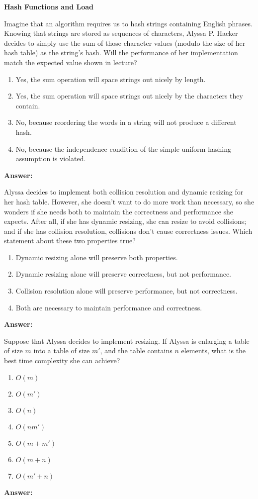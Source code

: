 \documentclass[12pt,twoside]{article}
\newcommand{\answer}{
 \par\medskip
 \textbf{Answer:}
}
\newcommand{\answerIa}{ \answer

}
\newcommand{\answerIb}{ \answer

}
\newcommand{\answerIc}{ \answer

}
\begin{document}
\begin{problems}

\problem {} \textbf{Hash Functions and Load}

\begin{problemparts}

\problempart Imagine that an algorithm requires us to hash strings containing English
phrases. Knowing that strings are stored as sequences of characters, Alyssa P. Hacker
decides to simply use the sum of those character values (modulo the size of her hash
table) as the string’s hash. Will the performance of her implementation match the
expected value shown in lecture?
  \begin{enumerate}
    \item Yes, the sum operation will space strings out nicely by length.
    \item Yes, the sum operation will space strings out nicely by the characters 
      they contain.
    \item No, because reordering the words in a string will not produce a different
      hash.
    \item No, because the independence condition of the simple uniform hashing
      assumption is violated.
  \end{enumerate}
\answerIa

  \problempart Alyssa decides to implement both collision resolution and dynamic
  resizing for her hash table. However, she doesn’t want to do more work than
  necessary, so she wonders if she needs both to maintain the correctness and
  performance she expects. After all, if she has dynamic resizing, she can resize to
  avoid collisions; and if she has collision resolution, collisions don’t cause
  correctness issues. Which statement about these two properties true?
    \begin{enumerate}
      \item Dynamic resizing alone will preserve both properties.
      \item Dynamic resizing alone will preserve correctness, but not performance.
      \item Collision resolution alone will preserve performance, but not
        correctness.
      \item Both are necessary to maintain performance and correctness.
    \end{enumerate}
\answerIb
    
  \problempart Suppose that Alyssa decides to implement resizing. If Alyssa is
  enlarging a table of size $m$ into a table of size $m'$, and the table contains
  $n$ elements, what is the best time complexity she can achieve?
    \begin{enumerate}
      \item $O(m)$
      \item $O(m')$
      \item $O(n)$
      \item $O(nm')$
      \item $O(m + m')$
      \item $O(m + n)$
      \item $O(m' + n)$
    \end{enumerate}
\answerIc 


\end{problemparts}
\end{problems}
\end{document}
